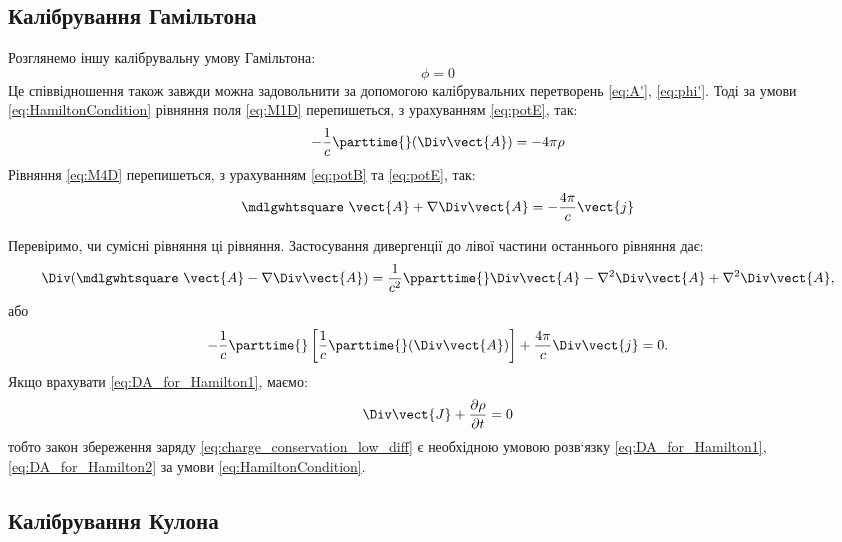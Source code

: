 \subsection*{Калібрування Гамільтона}

Розглянемо іншу калібрувальну умову Гамільтона:
\begin{equation}\label{eq:HamiltonCondition}
	\phi = 0
\end{equation}
Це співвідношення також завжди можна задовольнити за допомогою
калібрувальних перетворень \eqref{eq:A'}, \eqref{eq:phi'}. Тоді за умови \eqref{eq:HamiltonCondition} рівняння
поля \eqref{eq:M1D} перепишеться, з урахуванням \eqref{eq:potE}, так:
\begin{equation}
	-\frac1c \parttime{} (\Div \vect{A}) = -4\pi \rho
\end{equation}
Рівняння \eqref{eq:M4D} перепишеться, з урахуванням \eqref{eq:potB} та \eqref{eq:potE}, так:
\begin{equation}\label{eq:DA_for_Hamilton1}
	\mdlgwhtsquare\ \vect{A}  + \nabla \Div\vect{A} = -\frac{4\pi}{c} \vect{j}
\end{equation}

Перевіримо, чи сумісні рівняння ці рівняння. Застосування
дивергенції до лівої частини останнього рівняння дає:
\begin{equation*}
	\Div(\mdlgwhtsquare\ \vect{A}  - \nabla \Div\vect{A}) = \frac1{c^2} \pparttime{} \Div\vect{A} - \nabla^2\Div\vect{A} + \nabla^2\Div\vect{A},
\end{equation*}
або
\begin{equation}\label{eq:DA_for_Hamilton2}
	-\frac1c \parttime{} \left[ \frac1c \parttime{} (\Div\vect{A})\right] + \frac{4\pi}c \Div\vect{j} = 0.
\end{equation}
Якщо врахувати \eqref{eq:DA_for_Hamilton1}, маємо:
\begin{equation*}
	\Div \vect{J} + \frac{\partial \rho}{\partial t} = 0
\end{equation*}
тобто закон збереження заряду \eqref{eq:charge_conservation_low_diff} є необхідною умовою розв`язку
\eqref{eq:DA_for_Hamilton1}, \eqref{eq:DA_for_Hamilton2} за умови \eqref{eq:HamiltonCondition}.


\subsection*{Калібрування Кулона}


